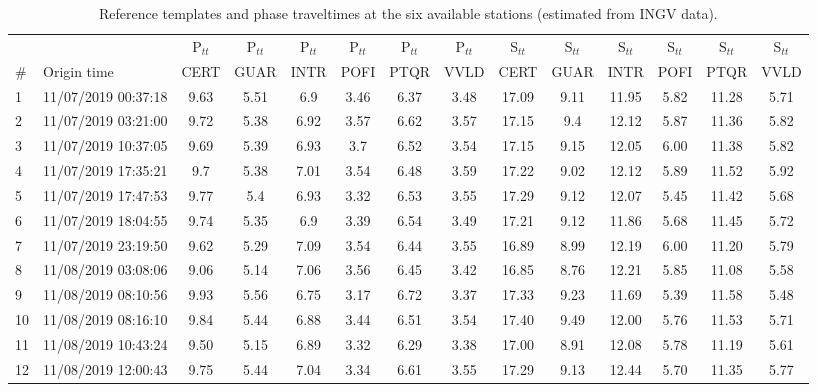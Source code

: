 \documentclass[a4paper,12pt]{article}
\begin{document}
\begin{landscape}

\begin{table}[!h]
\renewcommand{\thetable}{S\arabic{table}}
 \caption{Reference templates and phase traveltimes at the six available stations (estimated from INGV data).}
 \begin{center}
 \begin{tabular}{@{} l l c c c c c c c c c c c c}
    \hline
      & & P$_{tt}$ & P$_{tt}$ & P$_{tt}$ & P$_{tt}$ & P$_{tt}$ & P$_{tt}$ & S$_{tt}$ & S$_{tt}$ & S$_{tt}$ & S$_{tt}$ & S$_{tt}$ & S$_{tt}$   \\
      \# & Origin time     & CERT & GUAR & INTR & POFI & PTQR & VVLD & CERT & GUAR & INTR & POFI & PTQR & VVLD \\
    \hline
1 & 11/07/2019 00:37:18 & 9.63 & 5.51 & 6.9 & 3.46 & 6.37 & 3.48 & 17.09 & 9.11 & 11.95 & 5.82 & 11.28 & 5.71 \\
2 & 11/07/2019 03:21:00 & 9.72 & 5.38 & 6.92 & 3.57 & 6.62 & 3.57 & 17.15 & 9.4 & 12.12 & 5.87 & 11.36 & 5.82 \\
3 & 11/07/2019 10:37:05 & 9.69 & 5.39 & 6.93 & 3.7 & 6.52 & 3.54 & 17.15 & 9.15 & 12.05 & 6.00 & 11.38 & 5.82 \\
{4} & {11/07/2019 17:35:21} & {9.7} & {5.38} & {7.01} & {3.54} & {6.48} & {3.59} & {17.22} & {9.02} & {12.12} & {5.89} & {11.52} & {5.92} \\
5 & 11/07/2019 17:47:53 & 9.77 & 5.4 & 6.93 & 3.32 & 6.53 & 3.55 & 17.29 & 9.12 & 12.07 & 5.45 & 11.42 & 5.68 \\
6 & 11/07/2019 18:04:55 & 9.74 & 5.35 & 6.9 & 3.39 & 6.54 & 3.49 & 17.21 & 9.12 & 11.86 & 5.68 & 11.45 & 5.72 \\
7 & 11/07/2019 23:19:50 & 9.62 & 5.29 & 7.09 & 3.54 & 6.44 & 3.55 & 16.89 & 8.99 & 12.19 & 6.00 & 11.20 & 5.79 \\
8 & 11/08/2019 03:08:06 & 9.06 & 5.14 & 7.06 & 3.56 & 6.45 & 3.42 & 16.85 & 8.76 & 12.21 & 5.85 & 11.08 & 5.58 \\
9 & 11/08/2019 08:10:56 & 9.93 & 5.56 & 6.75 & 3.17 & 6.72 & 3.37 & 17.33 & 9.23 & 11.69 & 5.39 & 11.58 & 5.48 \\
10 & 11/08/2019 08:16:10 & 9.84 & 5.44 & 6.88 & 3.44 & 6.51 & 3.54 & 17.40 & 9.49 & 12.00 & 5.76 & 11.53 & 5.71 \\
11 & 11/08/2019 10:43:24 & 9.50 & 5.15 & 6.89 & 3.32 & 6.29 & 3.38 & 17.00 & 8.91 & 12.08 & 5.78 & 11.19 & 5.61 \\
12 & 11/08/2019 12:00:43 & 9.75 & 5.44 & 7.04 & 3.34 & 6.61 & 3.55 & 17.29 & 9.13 & 12.44 & 5.70 & 11.35 & 5.77 \\

\end{tabular}
\end{center}
\end{table}
\end{landscape}
\end{document}

